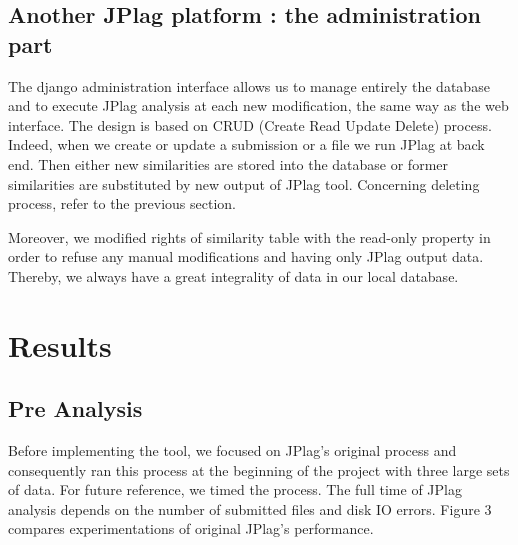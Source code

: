 \documentclass[twoside]{article}
\begin{document}
\begin{multicols*}{2}
\subsection{Another JPlag platform : the administration part}

The django administration interface allows us to manage entirely the database and to execute JPlag analysis at each new modification, the same way as the web interface. The design is based on CRUD (Create Read Update Delete) process. Indeed, when we create or update a submission or a file we run JPlag at back end. Then either new similarities are stored into the database or former similarities are substituted by new output of JPlag tool. Concerning deleting process, refer to the previous section. 

Moreover, we modified rights of similarity table with the read-only property in order to refuse any manual modifications and having only JPlag output data. Thereby, we always have a great integrality of data in our local database.
\vfill


\newpage
\section{Results}

\subsection{Pre Analysis}

Before implementing the tool, we focused on JPlag's original process and consequently ran this process at the beginning of the project with three large sets of data. For future reference, we timed the process. The full time of JPlag analysis depends on the number of submitted files and disk IO errors. Figure 3 compares experimentations of original JPlag's performance.  \\


\end{multicols*}
\end{document}

